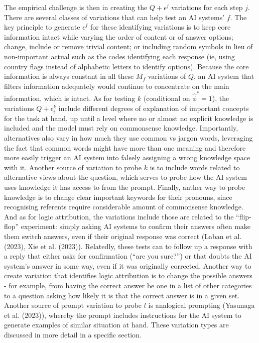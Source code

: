 \documentclass[
]{article}
\begin{document}
The empirical challenge is then in creating the \(Q + \epsilon^j\)
variations for each step \(j\). There are several classes of variations
that can help test an AI systems' \(f\). The key principle to generate
\(\epsilon^f\) for these identifying variations is to keep core
information intact while varying the order of content or of answer
options; change, include or remove trivial content; or including random
symbols in lieu of non-important actual such as the codes identifying
each response (ie, using country flags instead of alphabetic letters to
identify options). Because the core information is always constant in
all these \(M_f\) variations of \(Q\), an AI system that filters
information adequately would continue to concentrate on the main
information, which is intact. As for testing \(k\) (conditional on
\(\hat{\phi}^*=1\)), the variations \(Q + \epsilon_i^k\) include
different degrees of explanation of important concepts for the task at
hand, up until a level where no or almost no explicit knowledge is
included and the model must rely on commonsense knowledge. Importantly,
alternatives also vary in how much they use common vs jargon words,
leveraging the fact that common words might have more than one meaning
and therefore more easily trigger an AI system into falsely assigning a
wrong knowledge space with it. Another source of variation to probe
\(k\) is to include words related to alternative views about the
question, which serves to probe how the AI system uses knowledge it has
access to from the prompt. Finally, anther way to probe knowledge is to
change clear important keywords for their pronouns, since recognising
referents require considerable amount of commonsense knowledge. And as
for logic attribution, the variations include those are related to the
``flip-flop'' experiment: simply asking AI systems to confirm their
answers often make them switch answers, even if their original response
was correct (Laban et al. (2023), Xie et al. (2023)). Relatedly, these
tests can to follow up a response with a reply that either asks for
confirmation (``are you sure?'') or that doubts the AI system's answer
in some way, even if it was originally corrected. Another way to create
variation that identifies logic attribution is to change the possible
answers - for example, from having the correct answer be one in a list
of other categories to a question asking how likely it is that the
correct answer is in a given set. Another source of prompt variation to
probe \(l\) is analogical prompting (Yasunaga et al. (2023)), whereby
the prompt includes instructions for the AI system to generate examples
of similar situation at hand. These variation types are discussed in
more detail in a specific section.
\end{document}
